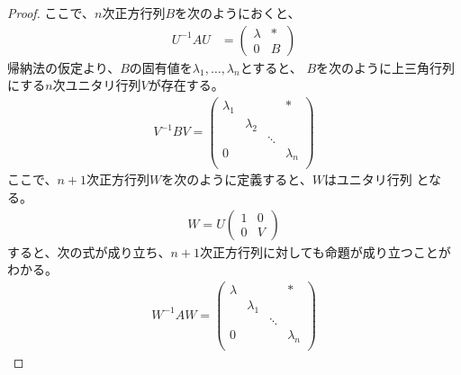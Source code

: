 {\begin{proof}
		ここで、$n$次正方行列$B$を次のようにおくと、
		\begin{equation*}\begin{split}
			U^{-1}AU &= \begin{pmatrix}
				\lambda & * \\
				0 & B
			\end{pmatrix}
		\end{split}\end{equation*}
		帰納法の仮定より、$B$の固有値を$\lambda_1,\dots,\lambda_n$とすると、
		$B$を次のように上三角行列にする$n$次ユニタリ行列$V$が存在する。
		\begin{equation*}\begin{split}
			V^{-1}BV = \begin{pmatrix}
				\lambda_1 & & & * \\
				& \lambda_2 \\
				& & \ddots \\
				0 & & & \lambda_n \\
			\end{pmatrix}
		\end{split}\end{equation*}
		ここで、$n+1$次正方行列$W$を次のように定義すると、$W$はユニタリ行列
		となる。
		\begin{equation*}\begin{split}
			W = U \begin{pmatrix}
				1 & 0 \\ 0 & V
			\end{pmatrix}
		\end{split}\end{equation*}
		すると、次の式が成り立ち、$n+1$次正方行列に対しても命題が成り立つことが
		わかる。
		\begin{equation*}\begin{split}
			W^{-1}AW = \begin{pmatrix}
				\lambda & & & * \\
				& \lambda_1 \\
				& & \ddots \\
				0 & & & \lambda_n \\
			\end{pmatrix}
		\end{split}\end{equation*}
	\end{proof} %

}
